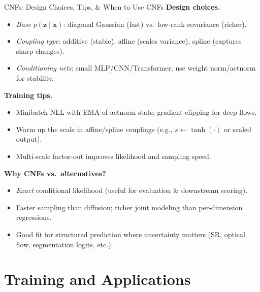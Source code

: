 \documentclass[aspectratio=169]{beamer}
\begin{document}
\begin{frame}{CNFs: Design Choices, Tips, \& When to Use CNFs}
\textbf{Design choices.}
\begin{itemize}
  \item \emph{Base} $p(\mathbf{z}\mid\mathbf{x})$: diagonal Gaussian (fast) vs.\ low-rank covariance (richer).
  \item \emph{Coupling type}: additive (stable), affine (scales variance), spline (captures sharp changes).
  \item \emph{Conditioning nets}: small MLP/CNN/Transformer; use weight norm/actnorm for stability.
\end{itemize}

\textbf{Training tips.}
\begin{itemize}
  \item Minibatch NLL with EMA of actnorm stats; gradient clipping for deep flows.
  \item Warm up the scale in affine/spline couplings (e.g., $s\!\leftarrow\!\tanh(\cdot)$ or scaled output).
  \item Multi-scale factor-out improves likelihood and sampling speed.
\end{itemize}

\textbf{Why CNFs vs.\ alternatives?}
\begin{itemize}
  \item \emph{Exact} conditional likelihood (useful for evaluation \& downstream scoring).
  \item Faster sampling than diffusion; richer joint modeling than per-dimension regressions.
  \item Good fit for structured prediction where uncertainty matters (SR, optical flow, segmentation logits, etc.).
\end{itemize}
\end{frame}

\section{Training and Applications}
\end{document}
